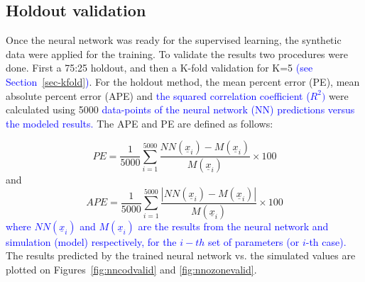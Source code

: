 \documentclass{optica-article}
\begin{document}
\subsection{Holdout validation}

Once the neural network was ready for the supervised learning, the synthetic data were applied for the training.
To validate the results two procedures were done. First a 75:25 holdout, and then a K-fold validation for K=5 \textcolor{blue}{(see Section~\ref{sec-kfold})}.
For the holdout method, the mean percent error (PE), mean absolute percent error (APE) and 
\textcolor{blue}{the squared correlation coefficient ($R^2)$} were calculated using 5000 \textcolor{blue}{data-points of the neural network (NN) predictions versus the modeled results.} 
The APE and PE are defined as follows:

\begin{equation}
	\label{eq:PE}
	PE = \frac{1}{5000}\sum_{i=1}^{5000} \dfrac{NN(\underline{x}_i) - M(\underline{x}_i)}{M(\underline{x}_i)} \times 100
\end{equation}
and
\begin{equation}
	\label{eq:APE}
	APE = \frac{1}{5000} \sum_{i=1}^{5000} \dfrac{|NN(\underline{x}_i) - M(\underline{x}_i)|}{M(\underline{x}_i)} \times 100
\end{equation}
\textcolor{blue}{where $NN(\underline{x}_i)$ and $M(\underline{x}_i)$ are the results from the neural network and simulation (model)  respectively, for the $i-th$ set of parameters (or $i$-th case).}
The results predicted by the trained neural network vs. the simulated values are plotted on Figures~\ref{fig:nncodvalid} and \ref{fig:nnozonevalid}.
\end{document}
